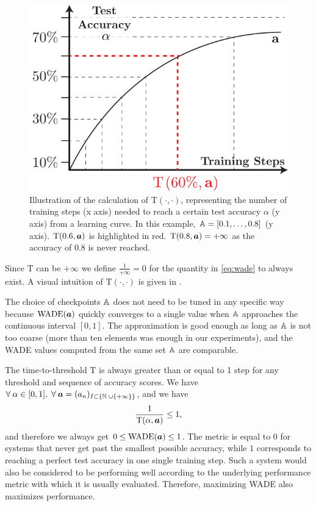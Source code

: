 \begin{figure}[htbp]
  \centering
 \includegraphics[width=.6\linewidth]{figures/metric_tto}
 \caption{Illustration of the calculation of $\text{T}(\cdot, \cdot)$,
   representing the number of training steps (x axis) needed to reach a certain test
   accuracy $\alpha$ (y axis) from a learning curve. In this example,
   ${\mathbb{A}} = [0.1, \ldots, 0.8]$ (y axis). $\text{T}(0.6, {\bm{a}})$ is highlighted in red.
   $\text{T}(0.8, {\bm{a}}) = +\infty$ as the accuracy of 0.8 is never reached.}
  \label{fig:metric_tto}

\end{figure}


Since $\text{T}$ can be $+\infty$ we define
$\frac{1}{+\infty} = 0$ for the quantity in \eqref{eq:wade} to always exist. A visual
intuition of $\text{T}(\cdot, \cdot)$ is given in .


The choice of checkpoints ${\mathbb{A}}$ does not need to be tuned in any specific way
because $\text{WADE}({\bm{a}})$ quickly converges to a single value when ${\mathbb{A}}$
approaches the continuous interval $[0, 1]$. The approximation is good enough as
long as ${\mathbb{A}}$ is not too coarse (more than ten elements was enough in our
experiments), and the WADE values computed from the same set ${\mathbb{A}}$ are
comparable.

The time-to-threshold $\text{T}$ is always greater than or equal to 1 step for any threshold and sequence of accuracy scores.
We have
$\forall\: \alpha \in [0, 1],\;  \forall\: {\bm{a}} = ({a}_{n})_{I \subset \{\mathbb{N}\; \cup \{+\infty\} \}}$, and we have
\begin{equation}
  \label{eq:wade-0-1}
\frac{1}{\text{T}(\alpha, {\bm{a}})} \leq 1,
\end{equation}
and therefore we always get $0 \leq \text{WADE}({\bm{a}}) \leq 1$. The metric is equal to $0$
for systems that never get past the smallest possible accuracy, while $1$
corresponds to reaching a perfect test accuracy in one single training step. Such
a system would also be considered to be performing well according to the
underlying performance metric with which it is usually evaluated. Therefore,
maximizing WADE also maximizes performance.


